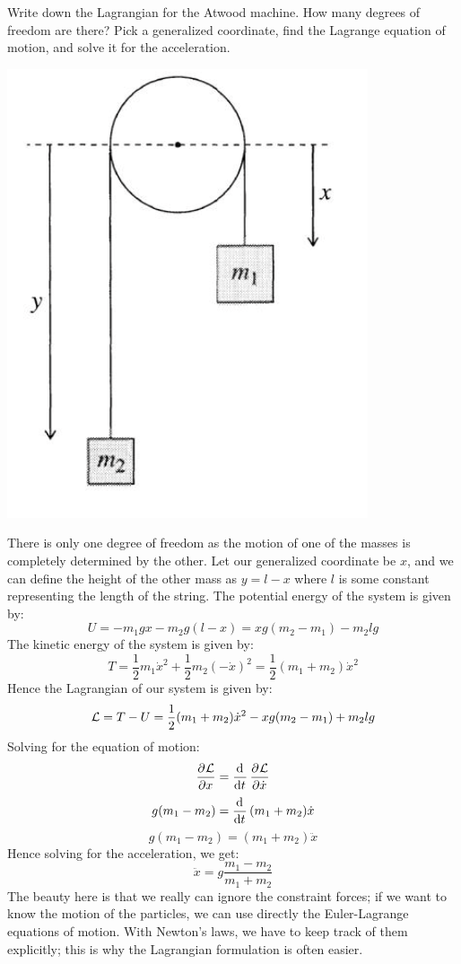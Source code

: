 \begin{p}
Write down the Lagrangian for the Atwood machine. How many degrees of freedom are there? Pick a generalized coordinate, find the Lagrange equation of motion, and solve it for the acceleration.
\begin{center}
    \includegraphics[scale=0.6]{Lecture-4/W4-img1.png}
\end{center}
\end{p}
\begin{s}
There is only one degree of freedom as the motion of one of the masses is completely determined by the other. Let our generalized coordinate be $x$, and we can define the height of the other mass as $y = l - x$ where $l$ is some constant representing the length of the string. The potential energy of the system is given by:
\[U = -m_1gx - m_2g(l-x) = xg(m_2-m_1) - m_2lg\]
The kinetic energy of the system is given by:
\[T = \frac{1}{2}m_1\dot{x}^2 + \frac{1}{2}m_2(-\dot{x})^2 = \frac{1}{2}(m_1 + m_2)\dot{x}^2\]
Hence the Lagrangian of our system is given by:
\[\mathcal{L} = T - U = \frac{1}{2}(m_1 + m_2)\dot{x}^2 - xg(m_2-m_1) + m_2lg\]
Solving for the equation of motion:
\[\dpd{\LL}{x} = \dod{}{t}\dpd{\LL}{\dot{x}}\]
\[g(m_1 - m_2) = \dod{}{t}(m_1 + m_2)\dot{x}\]
\[g(m_1 - m_2) = (m_1 + m_2)\ddot{x}\]
Hence solving for the acceleration, we get:
\[\ddot{x} = g\frac{m_1 - m_2}{m_1 + m_2}\]
The beauty here is that we really can ignore the constraint forces; if we want to know the motion of the particles, we can use directly the Euler-Lagrange equations of motion. With Newton's laws, we have to keep track of them explicitly; this is why the Lagrangian formulation is often easier.
\end{s}

